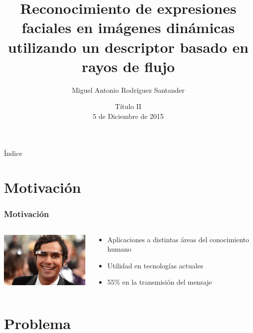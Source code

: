 \documentclass{beamer}
\title{Reconocimiento de expresiones faciales en imágenes dinámicas utilizando un descriptor basado en rayos de flujo}
\author{Miguel Antonio Rodríguez Santander}
\institute[Universidad Diego Portales] %
{%
  Universidad Diego Portales\\
  Facultad de Ingeniería\\
  Escuela de Informática y Telecomunicaciones
  
}
\date{Título II\\ 5 de Diciembre de 2015}
\begin{document}
\begin{frame}
  \titlepage
\end{frame}

\begin{frame}{Índice}
  \tableofcontents
\end{frame}




\section{Motivación}

\begin{frame}
  \frametitle{Motivación}
  \begin{columns}[onlytextwidth]
    \begin{column}{0.5\textwidth}
      \centering
      \includegraphics[width=5cm]{imagenes/google_glass.jpg}
    \end{column}
    \begin{column}{0.5\textwidth}
        \begin{itemize}
            \item Aplicaciones a distintas áreas del conocimiento humano
            \item Utilidad en tecnologías actuales
            \item 55\% en la transmisión del mensaje
        \end{itemize}
    \end{column}
  \end{columns}
\end{frame}


\section{Problema}
    
\end{document}

